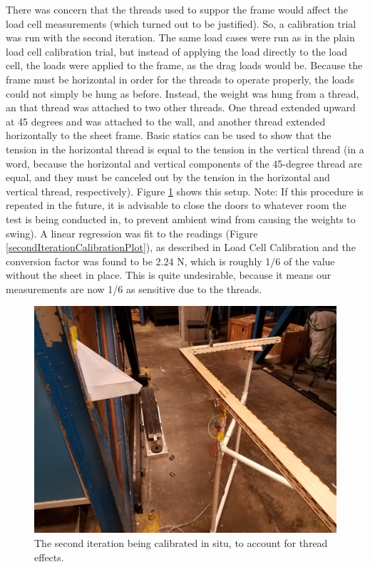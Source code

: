 \documentclass[12pt]{report} %
\begin{document}
There was concern that the threads used to suppor the frame would affect the load cell measurements (which turned out to be justified).
So, a calibration trial was run with the second iteration. The same load cases were run as in the plain load cell calibration trial,
but instead of applying the load directly to the load cell, the loads were applied to the frame, as the drag loads would be. Because
the frame must be horizontal in order for the threads to operate properly, the loads could not simply be hung as before. Instead,
the weight was hung from a thread, an that thread was attached to two other threads. One thread extended upward at 45 degrees and was
attached to the wall, and another thread extended horizontally to the sheet frame. Basic statics can be used to show that the tension
in the horizontal thread is equal to the tension in the vertical thread (in a word, because the horizontal and vertical components
of the 45-degree thread are equal, and they must be canceled out by the tension in the horizontal and vertical thread, respectively).
Figure \ref{secondIterationCalibration} shows this setup. Note: If this procedure is repeated in the future, it is advisable to close
the doors to whatever room the test is being conducted in, to prevent ambient wind from causing the weights to swing).
A linear regression was fit to the readings (Figure \ref{secondIterationCalibrationPlot}), as described in Load Cell Calibration
and the conversion factor was found to be 2.24 N, which is roughly 1/6 of the value without the sheet in place. This is quite undesirable,
because it means our measurements are now 1/6 as sensitive due to the threads.

\begin{figure}
\includegraphics[width = 0.7\linewidth]{secondIterationCalibration.jpg}
\centering
\caption{The second iteration being calibrated in situ, to account for thread effects.}
\label{secondIterationCalibration}
\end{figure}
\end{document}
